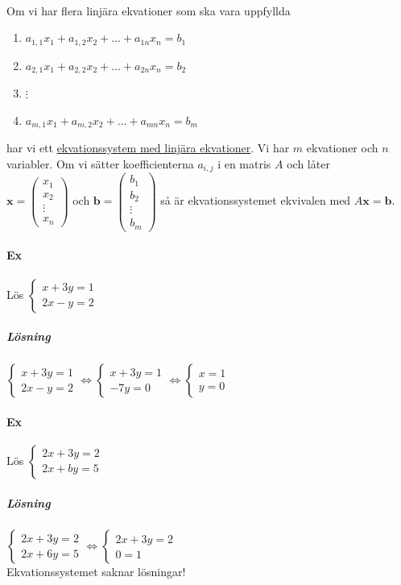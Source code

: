 \paragraph{} Om vi har flera linjära ekvationer som ska vara uppfyllda
\begin{enumerate}
    \item[] $a_{1,1}x_{1}+a_{1,2}x_{2}+\ldots+a_{1n}x_{n}=b_{1}$
    \item[] $a_{2,1}x_{1}+a_{2,2}x_{2}+\ldots+a_{2n}x_{n}=b_{2}$
    \item[] $\vdots$
    \item[] $a_{m,1}x_{1}+a_{m,2}x_{2}+\ldots+a_{mn}x_{n}=b_{m}$  
\end{enumerate}
har vi ett \underline{ekvationssystem med linjära ekvationer}.
Vi har $m$ ekvationer och $n$ variabler.
Om vi sätter koefficienterna $a_{i,j}$ i en matris $A$ och låter\\
$\bm{x}=\begin{pmatrix}
    x_{1}\\x_{2}\\\vdots\\x_{n}
\end{pmatrix}$ och $\bm{b}=\begin{pmatrix}
    b_{1}\\b_{2}\\\vdots\\b_{m}
\end{pmatrix}$ så är ekvationssystemet ekvivalen med $A\bm{x}=\bm{b}$.

\paragraph{Ex} Lös $\begin{cases}x+3y=1\\2x-y=2\end{cases}$
\subparagraph{Lösning} 
$\begin{cases}
    x+3y=1\\
    2x-y=2
\end{cases}\Leftrightarrow
\begin{cases}
    x+3y=1\\
    -7y=0
\end{cases}\Leftrightarrow
\begin{cases}
    x=1\\
    y=0
\end{cases}$

\paragraph{Ex} Lös $\begin{cases}2x+3y=2\\2x+by=5\end{cases}$
\subparagraph{Lösning} 
$\begin{cases}
    2x+3y=2\\
    2x+6y=5
\end{cases}\Leftrightarrow
\begin{cases}
    2x+3y=2\\
    0=1
\end{cases}$\\
Ekvationssystemet saknar lösningar!

